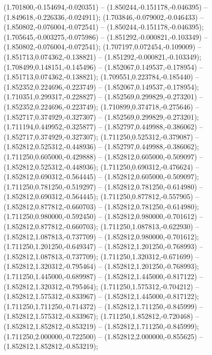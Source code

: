  (1.701800,-0.154694,-0.020351) -- (1.850244,-0.151178,-0.046395) -- (1.849618,-0.226336,-0.024911);
 (1.703846,-0.079002,-0.046433) -- (1.850802,-0.076004,-0.072541) -- (1.850244,-0.151178,-0.046395);
 (1.705645,-0.003275,-0.075986) -- (1.851292,-0.000821,-0.103349) -- (1.850802,-0.076004,-0.072541);
 (1.707197,0.072454,-0.109009) -- (1.851713,0.074362,-0.138821) -- (1.851292,-0.000821,-0.103349);
 (1.708499,0.148151,-0.145496) -- (1.852067,0.149537,-0.178954) -- (1.851713,0.074362,-0.138821);
 (1.709551,0.223784,-0.185440) -- (1.852352,0.224696,-0.223749) -- (1.852067,0.149537,-0.178954);
 (1.710351,0.299317,-0.228827) -- (1.852569,0.299829,-0.273201) -- (1.852352,0.224696,-0.223749);
 (1.710899,0.374718,-0.275646) -- (1.852717,0.374929,-0.327307) -- (1.852569,0.299829,-0.273201);
 (1.711194,0.449952,-0.325877) -- (1.852797,0.449988,-0.386062) -- (1.852717,0.374929,-0.327307);
 (1.711250,0.525312,-0.379087) -- (1.852812,0.525312,-0.448936) -- (1.852797,0.449988,-0.386062);
 (1.711250,0.605000,-0.429888) -- (1.852812,0.605000,-0.509097) -- (1.852812,0.525312,-0.448936);
 (1.711250,0.690312,-0.476624) -- (1.852812,0.690312,-0.564445) -- (1.852812,0.605000,-0.509097);
 (1.711250,0.781250,-0.519297) -- (1.852812,0.781250,-0.614980) -- (1.852812,0.690312,-0.564445);
 (1.711250,0.877812,-0.557905) -- (1.852812,0.877812,-0.660703) -- (1.852812,0.781250,-0.614980);
 (1.711250,0.980000,-0.592450) -- (1.852812,0.980000,-0.701612) -- (1.852812,0.877812,-0.660703);
 (1.711250,1.087813,-0.622930) -- (1.852812,1.087813,-0.737709) -- (1.852812,0.980000,-0.701612);
 (1.711250,1.201250,-0.649347) -- (1.852812,1.201250,-0.768993) -- (1.852812,1.087813,-0.737709);
 (1.711250,1.320312,-0.671699) -- (1.852812,1.320312,-0.795464) -- (1.852812,1.201250,-0.768993);
 (1.711250,1.445000,-0.689987) -- (1.852812,1.445000,-0.817122) -- (1.852812,1.320312,-0.795464);
 (1.711250,1.575312,-0.704212) -- (1.852812,1.575312,-0.833967) -- (1.852812,1.445000,-0.817122);
 (1.711250,1.711250,-0.714372) -- (1.852812,1.711250,-0.845999) -- (1.852812,1.575312,-0.833967);
 (1.711250,1.852812,-0.720468) -- (1.852812,1.852812,-0.853219) -- (1.852812,1.711250,-0.845999);
 (1.711250,2.000000,-0.722500) -- (1.852812,2.000000,-0.855625) -- (1.852812,1.852812,-0.853219);
